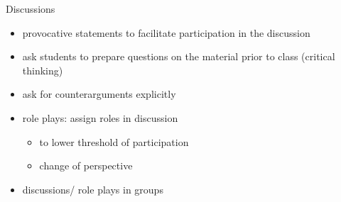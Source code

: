 \begin{frame}{Discussions}
	\pause
	\begin{itemize}[<+->]
		\item provocative statements to \alert{facilitate participation} in the discussion
		\item ask students to prepare questions on the material prior to class	(\alert{critical thinking})	
		\item ask for counterarguments explicitly
		\item \alert{role plays}: assign roles in discussion
		\begin{itemize}
			\item to lower threshold of participation
			\item \alert{change of perspective}
		\end{itemize}
	\item discussions/ role plays in groups
	\end{itemize}
\end{frame}


